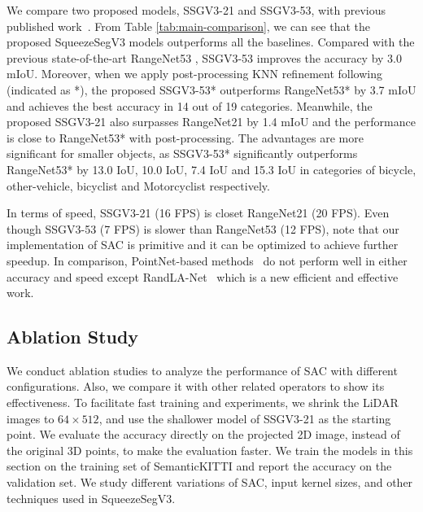 \documentclass[runningheads]{llncs}
\begin{document}
We compare two proposed models, SSGV3-21 and SSGV3-53, with previous published work~\cite{qi2017pointnet,qi2017pointnet++,landrieu2018large,su2018splatnet,tatarchenko2018tangent,wu2017squeezeseg,wu2018squeezesegv2,milioto2019rangenet++}. From Table \ref{tab:main-comparison}, we can see that the proposed SqueezeSegV3 models outperforms all the baselines. Compared with the previous state-of-the-art RangeNet53 \cite{milioto2019rangenet++}, SSGV3-53 improves the accuracy by 3.0 mIoU. Moreover, when we apply post-processing KNN refinement following~\cite{milioto2019rangenet++} (indicated as *), the proposed SSGV3-53* outperforms RangeNet53* by 3.7 mIoU and achieves the best accuracy in 14 out of 19 categories. Meanwhile, the proposed SSGV3-21 also surpasses RangeNet21 by 1.4 mIoU and the performance is close to RangeNet53* with post-processing. The advantages are more significant for smaller objects, as SSGV3-53* significantly outperforms RangeNet53* by 13.0 IoU, 10.0 IoU, 7.4 IoU and 15.3 IoU in categories of bicycle, other-vehicle, bicyclist and Motorcyclist respectively. 

In terms of speed, SSGV3-21 (16 FPS) is closet RangeNet21 (20 FPS). Even though SSGV3-53 (7 FPS) is slower than RangeNet53 (12 FPS), note that our implementation of SAC is primitive and it can be optimized to achieve further speedup.
In comparison, PointNet-based methods~\cite{qi2017pointnet,qi2017pointnet++,landrieu2018large,su2018splatnet,tatarchenko2018tangent} do not perform well in either accuracy and speed except RandLA-Net~\cite{hu2019randla} which is a new efficient and effective work.



\subsection{Ablation Study}
\label{sec:ablation}
We conduct ablation studies to analyze the performance of SAC with different configurations. Also, we compare it with other related operators to show its effectiveness. To facilitate fast training and experiments, we shrink the LiDAR images to $64 \times 512$, and use the shallower model of SSGV3-21 as the starting point. 
We evaluate the accuracy directly on the projected 2D image, instead of the original 3D points, to make the evaluation faster. We train the models in this section on the training set of SemanticKITTI and report the accuracy on the validation set. We study different variations of SAC, input kernel sizes, and other techniques used in SqueezeSegV3. 
\end{document}
